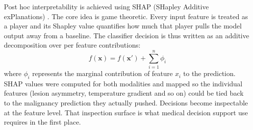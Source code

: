 \documentclass[lettersize,journal]{IEEEtran}
\begin{document}
Post hoc interpretability is achieved using SHAP (SHapley Additive exPlanations) \cite{Lundberg2017SHAP}. The core idea is game theoretic. Every input feature is treated as a player and its Shapley value quantifies how much that player pulls the model output away from a baseline. The classifier decision is thus written as an additive decomposition over per feature contributions:
\begin{equation}
f(\mathbf{x}) = f(\mathbf{x'}) + \sum_{i=1}^{n}\phi_i
\label{eq:shap_code}
\end{equation}
where $\phi_i$ represents the marginal contribution of feature $x_i$ to the prediction. SHAP values were computed for both modalities and mapped so the individual features (lesion asymmetry, temperature gradient and so on) could be tied back to the malignancy prediction they actually pushed. Decisions become inspectable at the feature level. That inspection surface is what medical decision support use requires in the first place.
\end{document}
